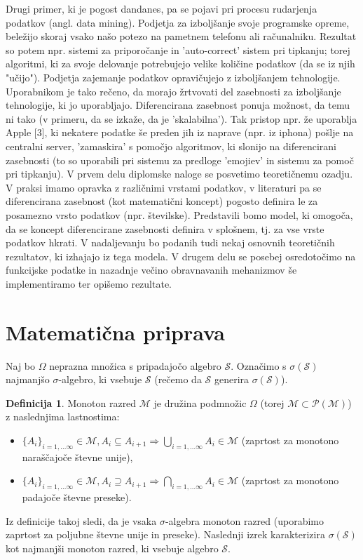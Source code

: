 \documentclass[12pt,a4paper]{amsart}
\theoremstyle{definition} %
\newtheorem{definicija}{Definicija}[section]
\theoremstyle{plain} %
\begin{document}
\newline
\newline
Drugi primer, ki je pogost dandanes, pa se pojavi pri procesu rudarjenja podatkov (angl. data mining). Podjetja za izboljšanje svoje programske opreme, beležijo skoraj vsako našo potezo na pametnem telefonu ali računalniku. Rezultat so potem npr. sistemi za priporočanje in 'auto-correct' sistem pri tipkanju; torej algoritmi, ki za svoje delovanje potrebujejo velike količine podatkov (da se iz njih "učijo"). Podjetja zajemanje podatkov opravičujejo z izboljšanjem tehnologije. Uporabnikom je tako rečeno, da morajo žrtvovati del zasebnosti za izboljšanje tehnologije, ki jo uporabljajo. Diferencirana zasebnost ponuja možnost, da temu ni tako (v primeru, da se izkaže, da je 'skalabilna'). Tak pristop npr. že uporablja Apple [3], ki nekatere podatke še preden jih iz naprave (npr. iz iphona) pošlje na centralni server, 'zamaskira' s pomočjo algoritmov, ki slonijo na diferencirani zasebnosti (to so uporabili pri sistemu za predloge 'emojiev' in sistemu za pomoč pri tipkanju). 
\newline
\newline
V prvem delu diplomske naloge se posvetimo teoretičnemu ozadju. V praksi imamo opravka z različnimi vrstami podatkov, v literaturi pa se diferencirana zasebnost (kot matematični koncept) pogosto definira le za posamezno vrsto podatkov (npr. številske). Predstavili bomo model, ki omogoča, da se koncept diferencirane zasebnosti definira v splošnem, tj. za vse vrste podatkov hkrati. V nadaljevanju bo podanih tudi nekaj osnovnih teoretičnih rezultatov, ki izhajajo iz tega modela. V drugem delu se posebej osredotočimo na funkcijske podatke in nazadnje večino obravnavanih mehanizmov še implementiramo ter opišemo rezultate.

\section{Matematična priprava}

Naj bo $\Omega$ neprazna množica s pripadajočo algebro $\mathcal{S}$. Označimo s $\sigma(\mathcal{S})$ najmanjšo $\sigma$-algebro, ki vsebuje $\mathcal{S}$ (rečemo da $\mathcal{S}$ generira $\sigma(\mathcal{S})$).
\begin{definicija}
Monoton razred $\mathcal{M}$ je družina podmnožic $\Omega$ (torej $\mathcal{M} \subset \mathcal{P(\mathcal{M})}$) z naslednjima lastnostima:
\begin{itemize}
\item  $\{A_i\}_{i=1,...\infty} \in \mathcal{M}, A_i \subseteq A_{i+1} \Rightarrow \bigcup_{i=1,...\infty} A_i \in \mathcal{M}$ (zaprtost za monotono naraščajoče števne unije),
\item  $\{A_i\}_{i=1,...\infty} \in \mathcal{M}, A_i \supseteq A_{i+1} \Rightarrow \bigcap_{i=1,...\infty} A_i \in \mathcal{M}$ (zaprtost za monotono padajoče števne preseke).
\end{itemize}
\end{definicija}
Iz definicije takoj sledi, da je vsaka $\sigma$-algebra monoton razred (uporabimo zaprtost za poljubne števne unije in preseke). Naslednji izrek karakterizira $\sigma(\mathcal{S})$ kot najmanjši monoton razred, ki vsebuje algebro $\mathcal{S}$.
\end{document}
